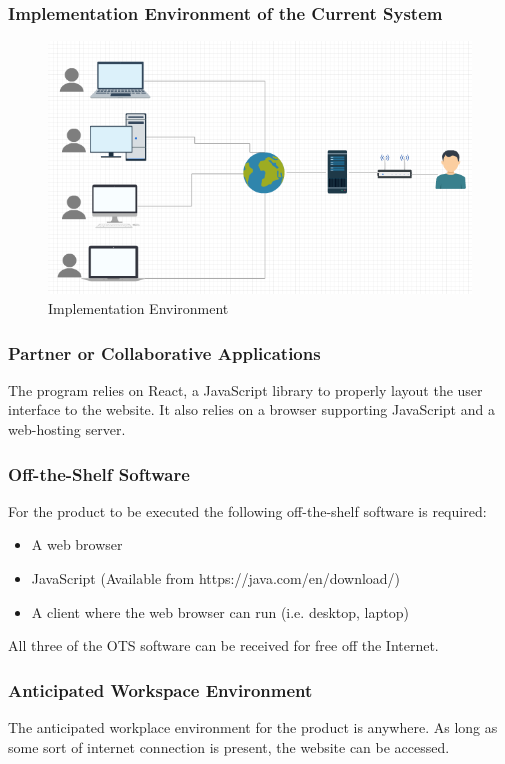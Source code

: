 \documentclass[11pt, oneside]{article}
\begin{document}
\subsubsection*{Implementation Environment of the Current System}
\begin{figure}[H] %
   \centering
   \includegraphics[width=6in]{DeploymentDiagram.png}
   \caption{Implementation Environment}
   \label{fig:example}
\end{figure}

\subsubsection{Partner or Collaborative Applications}
The program relies on React, a JavaScript library to properly layout the user interface to the website. It also relies on a browser supporting JavaScript and a web-hosting server.


\subsubsection{Off-the-Shelf Software}
For the product to be executed the following off-the-shelf software is required:\begin{itemize}
\item
A web browser
\item
JavaScript (Available from https://java.com/en/download/)
\item
A client where the web browser can run (i.e. desktop, laptop)
\end{itemize}

All three of the OTS software can be received for free off the Internet.


\subsubsection{Anticipated Workspace Environment}
The anticipated workplace environment for the product is anywhere. As long as some sort of internet connection is present, the website can be accessed.
\end{document}
